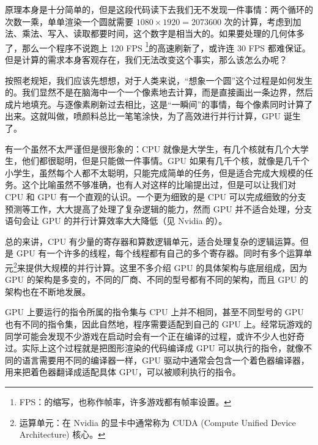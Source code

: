 原理本身是十分简单的，但是这段代码读下去我们无不发现一件事情：两个循环的次数一乘，单单渲染一个圆就需要 $1080 \times 1920 = 2073600$ 次的计算，考虑到加法、乘法、写入、读取都要时间，这个数字是相当大的。如果要处理的几何体多了，那么一个程序不说跑上 120 FPS \footnote{FPS：的缩写，也称作帧率，许多游戏都有帧率设置。}的高速刷新了，或许连 30 FPS 都难保证。但是计算的需求本身客观存在，我们无法改变这个事实，那么该怎么办呢？

按照老规矩，我们应该先想想，对于人类来说，“想象一个圆”这个过程是如何发生的。我们显然不是在脑海中一个一个像素地去计算，而是直接画出一条边界，然后成片地填充。与逐像素刷新过去相比，这是“一瞬间”的事情，每个像素同时计算了出来。这就叫做，喷颜料总比一笔笔涂快，为了高效进行并行计算，GPU 诞生了。

有一个虽然不太严谨但是很形象的：CPU 就像是大学生，有几个核就有几个大学生，他们都很聪明，但是只能做一件事情。GPU 如果有几千个核，就像是几千个小学生，虽然每个人都不太聪明，只能完成简单的任务，但是适合完成大规模的任务。这个比喻虽然不够准确，也有人对这样的比喻提出过，但是可以让我们对 CPU 和 GPU 有一个直观的认识。一个更为细致的是 CPU 可以完成细致的分支预测等工作，大大提高了处理了复杂逻辑的能力，然而 GPU 并不适合处理，分支语句会让 GPU 的并行计算效率大大降低（见 Nvidia 的）。

总的来讲，CPU 有少量的寄存器和算数逻辑单元，适合处理复杂的逻辑运算。但是 GPU 有一个许多的线程，每个线程都有自己的多个寄存器。同时有多个运算单元\footnote{运算单元：在 Nvidia 的显卡中通常称为 CUDA (Compute Unified Device Architecture) 核心。}来提供大规模的并行计算。这里不多介绍 GPU 的具体架构与底层组成，因为 GPU 的架构是多变的，不同的厂商、不同的型号都有不同的架构，而且 GPU 的架构也在不断地发展。

GPU 上要运行的指令所属的指令集与 CPU 上并不相同，甚至不同型号的 GPU 也有不同的指令集，因此自然地，程序需要适配到自己的 GPU 上。经常玩游戏的同学可能会发现不少游戏在启动时会有一个正在编译的过程，或许不少人也好奇过。实际上这个过程就是把图形渲染的代码编译成 GPU 可以执行的指令，就像不同的语言需要用不同的编译器一样，GPU 驱动中通常会包含一个着色器编译器，用来把着色器翻译成适配具体 GPU，可以被顺利执行的指令。

